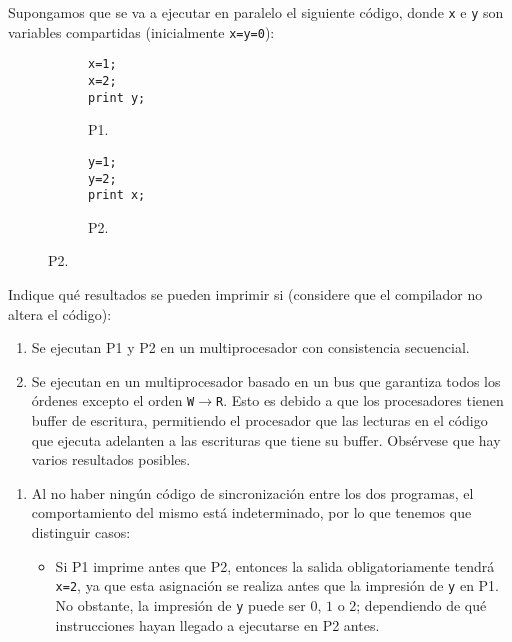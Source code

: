 \begin{ejercicio}
    Supongamos que se va a ejecutar en paralelo el siguiente código, donde \verb|x| e \verb|y| son variables compartidas (inicialmente \verb|x=y=0|):
    \begin{figure}[H]
        \centering
        \begin{subfigure}{0.3\textwidth}
            \begin{verbatim}
x=1;
x=2;
print y;
            \end{verbatim}
            \caption{P1.}
        \end{subfigure}\hspace{3cm}
        \begin{subfigure}{0.3\textwidth}
            \begin{verbatim}
y=1;
y=2;
print x;
            \end{verbatim}
            \caption{P2.}            
        \end{subfigure}
    \end{figure}

    Indique qué resultados se pueden imprimir si (considere que el compilador no altera el código):
    \begin{enumerate}
        \item Se ejecutan P1 y P2 en un multiprocesador con consistencia secuencial.
        \item Se ejecutan en un multiprocesador basado en un bus que garantiza todos los órdenes excepto el orden \verb|W|$\to$\verb|R|. Esto es debido a que los procesadores tienen buffer de escritura, permitiendo el procesador que las lecturas en el código que ejecuta adelanten a las escrituras que tiene su buffer.  Obsérvese que hay varios resultados posibles.
    \end{enumerate}

    \begin{enumerate}
        \item Al no haber ningún código de sincronización entre los dos programas, el comportamiento del mismo está indeterminado, por lo que tenemos que distinguir casos:
        \begin{itemize}
            \item Si P1 imprime antes que P2, entonces la salida obligatoriamente tendrá \verb|x=2|, ya que esta asignación se realiza antes que la impresión de \verb|y| en P1.
            No obstante, la impresión de \verb|y| puede ser $0$, $1$ o $2$; dependiendo de qué instrucciones hayan llegado a ejecutarse en P2 antes.


\end{itemize}
\end{enumerate}
\end{ejercicio}
